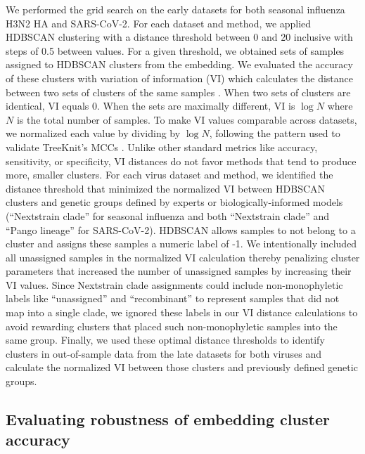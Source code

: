 \documentclass[webpdf,contemporary,large,single]{oup-authoring-template}%
\theoremstyle{thmstyleone}%
\theoremstyle{thmstyletwo}%
\theoremstyle{thmstylethree}%
\begin{document}
We performed the grid search on the early datasets for both seasonal influenza H3N2 HA and SARS-CoV-2.
For each dataset and method, we applied HDBSCAN clustering with a distance threshold between 0 and 20 inclusive with steps of 0.5 between values.
For a given threshold, we obtained sets of samples assigned to HDBSCAN clusters from the embedding.
We evaluated the accuracy of these clusters with variation of information (VI) which calculates the distance between two sets of clusters of the same samples \citep{meilua2003comparing}.
When two sets of clusters are identical, VI equals 0.
When the sets are maximally different, VI is $\log{N}$ where $N$ is the total number of samples.
To make VI values comparable across datasets, we normalized each value by dividing by $\log{N}$, following the pattern used to validate TreeKnit's MCCs \citep{Barrat-Charlaix2022}.
Unlike other standard metrics like accuracy, sensitivity, or specificity, VI distances do not favor methods that tend to produce more, smaller clusters.
For each virus dataset and method, we identified the distance threshold that minimized the normalized VI between HDBSCAN clusters and genetic groups defined by experts or biologically-informed models (``Nextstrain clade'' for seasonal influenza and both ``Nextstrain clade'' and ``Pango lineage'' for SARS-CoV-2).
HDBSCAN allows samples to not belong to a cluster and assigns these samples a numeric label of -1.
We intentionally included all unassigned samples in the normalized VI calculation thereby penalizing cluster parameters that increased the number of unassigned samples by increasing their VI values.
Since Nextstrain clade assignments could include non-monophyletic labels like ``unassigned'' and ``recombinant'' to represent samples that did not map into a single clade, we ignored these labels in our VI distance calculations to avoid rewarding clusters that placed such non-monophyletic samples into the same group.
Finally, we used these optimal distance thresholds to identify clusters in out-of-sample data from the late datasets for both viruses and calculate the normalized VI between those clusters and previously defined genetic groups.

\subsection{Evaluating robustness of embedding cluster accuracy}
\end{document}
